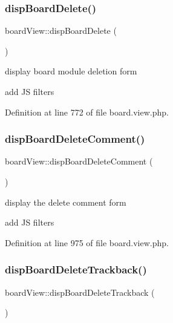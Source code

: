 \subsubsection{\texorpdfstring{disp\+Board\+Delete()}{dispBoardDelete()}}
{\footnotesize\ttfamily board\+View\+::disp\+Board\+Delete (\begin{DoxyParamCaption}{ }\end{DoxyParamCaption})}



display board module deletion form 

add JS filters

Definition at line 772 of file board.\+view.\+php.

\hypertarget{classboardView_abb9180578737e27fe2bd16485ccf2df0}{}\label{classboardView_abb9180578737e27fe2bd16485ccf2df0} 
\subsubsection{\texorpdfstring{disp\+Board\+Delete\+Comment()}{dispBoardDeleteComment()}}
{\footnotesize\ttfamily board\+View\+::disp\+Board\+Delete\+Comment (\begin{DoxyParamCaption}{ }\end{DoxyParamCaption})}



display the delete comment form 

add JS filters

Definition at line 975 of file board.\+view.\+php.

\hypertarget{classboardView_aefd0c292301210361b441d848a42a7eb}{}\label{classboardView_aefd0c292301210361b441d848a42a7eb} 
\subsubsection{\texorpdfstring{disp\+Board\+Delete\+Trackback()}{dispBoardDeleteTrackback()}}
{\footnotesize\ttfamily board\+View\+::disp\+Board\+Delete\+Trackback (\begin{DoxyParamCaption}{ }\end{DoxyParamCaption})}



